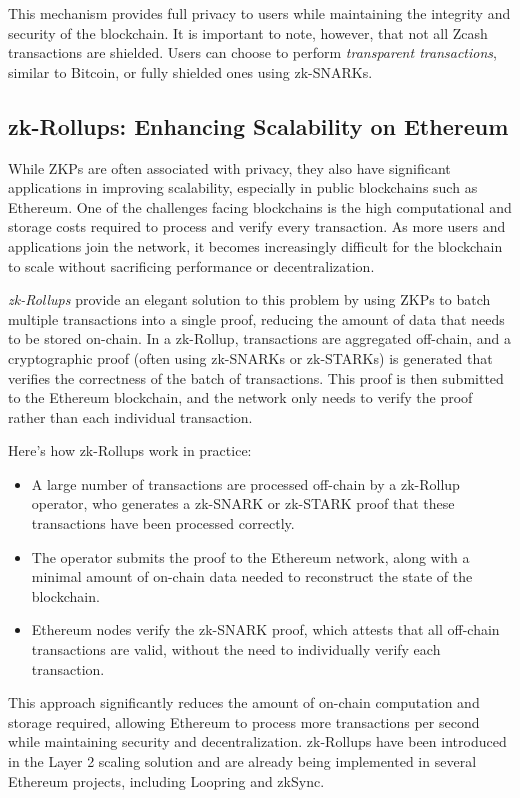 This mechanism provides full privacy to users while maintaining the integrity and security of the blockchain. It is important to note, however, that not all Zcash transactions are shielded. Users can choose to perform \textit{transparent transactions}, similar to Bitcoin, or fully shielded ones using zk-SNARKs.

\subsection{zk-Rollups: Enhancing Scalability on Ethereum}

While ZKPs are often associated with privacy, they also have significant applications in improving scalability, especially in public blockchains such as Ethereum. One of the challenges facing blockchains is the high computational and storage costs required to process and verify every transaction. As more users and applications join the network, it becomes increasingly difficult for the blockchain to scale without sacrificing performance or decentralization.

\textit{zk-Rollups} \cite{loopringZKRollups} provide an elegant solution to this problem by using ZKPs to batch multiple transactions into a single proof, reducing the amount of data that needs to be stored on-chain. In a zk-Rollup, transactions are aggregated off-chain, and a cryptographic proof (often using zk-SNARKs or zk-STARKs) is generated that verifies the correctness of the batch of transactions. This proof is then submitted to the Ethereum blockchain, and the network only needs to verify the proof rather than each individual transaction.

Here’s how zk-Rollups work in practice:

\begin{itemize}
    \item A large number of transactions are processed off-chain by a zk-Rollup operator, who generates a zk-SNARK or zk-STARK proof that these transactions have been processed correctly.
    \item The operator submits the proof to the Ethereum network, along with a minimal amount of on-chain data needed to reconstruct the state of the blockchain.
    \item Ethereum nodes verify the zk-SNARK proof, which attests that all off-chain transactions are valid, without the need to individually verify each transaction.
\end{itemize}

This approach significantly reduces the amount of on-chain computation and storage required, allowing Ethereum to process more transactions per second while maintaining security and decentralization. zk-Rollups have been introduced in the Layer 2 scaling solution and are already being implemented in several Ethereum projects, including Loopring and zkSync.

